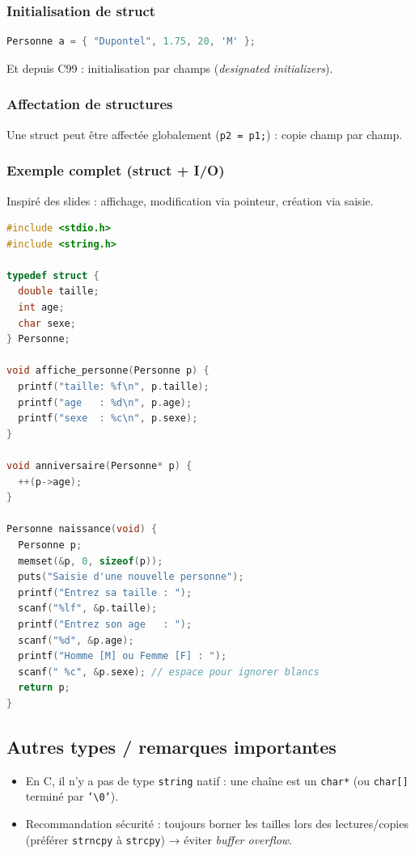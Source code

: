 \subsubsection{Initialisation de struct}
\begin{lstlisting}[language=C]
Personne a = { "Dupontel", 1.75, 20, 'M' };
\end{lstlisting}
Et depuis C99 : initialisation par champs (\textit{designated initializers}).

\subsubsection{Affectation de structures}
Une struct peut être affectée globalement (\texttt{p2 = p1;}) : copie champ par champ.

\subsubsection{Exemple complet (struct + I/O)}
Inspiré des slides : affichage, modification via pointeur, création via saisie. 

\begin{lstlisting}[language=C]
#include <stdio.h>
#include <string.h>

typedef struct {
  double taille;
  int age;
  char sexe;
} Personne;

void affiche_personne(Personne p) {
  printf("taille: %f\n", p.taille);
  printf("age   : %d\n", p.age);
  printf("sexe  : %c\n", p.sexe);
}

void anniversaire(Personne* p) {
  ++(p->age);
}

Personne naissance(void) {
  Personne p;
  memset(&p, 0, sizeof(p));
  puts("Saisie d'une nouvelle personne");
  printf("Entrez sa taille : ");
  scanf("%lf", &p.taille);
  printf("Entrez son age   : ");
  scanf("%d", &p.age);
  printf("Homme [M] ou Femme [F] : ");
  scanf(" %c", &p.sexe); // espace pour ignorer blancs
  return p;
}
\end{lstlisting}

\subsection{Autres types / remarques importantes}
\begin{itemize}
  \item En C, il n’y a pas de type \texttt{string} natif : une chaîne est un \texttt{char*} (ou \texttt{char[]} terminé par \texttt{'\textbackslash 0'}).
  \item Recommandation sécurité : toujours borner les tailles lors des lectures/copies (préférer \texttt{strncpy} à \texttt{strcpy}) → éviter \textit{buffer overflow}.
\end{itemize}

